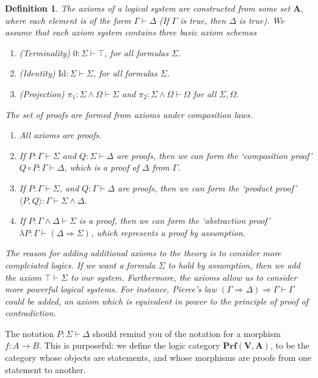 \documentclass{article}
\theoremstyle{plain}
\newtheorem{definition}{Definition}
\begin{document}
\begin{definition}
    The axioms of a logical system are constructed from some set $\mathbf{A}$, where each element is of the form $\Gamma \vdash \Delta$ (If $\Gamma$ is true, then $\Delta$ is true). We assume that each axiom system contains three basic axiom schemas
    \begin{enumerate}
        \item(Terminality) $0: \Sigma \vdash \top$, for all formulas $\Sigma$.
        \item(Identity) $\text{Id}: \Sigma \vdash \Sigma$, for all formulas $\Sigma$.
        \item(Projection) $\pi_1: \Sigma \wedge \Omega \vdash \Sigma$ and $\pi_2: \Sigma \wedge \Omega \vdash \Omega$ for all $\Sigma, \Omega$.
    \end{enumerate}
    The set of proofs are formed from axioms under composition laws.
    \begin{enumerate}
        \item All axioms are proofs.
        \item If $P: \Gamma \vdash \Sigma$ and $Q: \Sigma \vdash \Delta$ are proofs, then we can form the `composition proof' $Q \circ P: \Gamma \vdash \Delta$, which is a proof of $\Delta$ from $\Gamma$.
        \item If $P: \Gamma \vdash \Sigma$, and $Q: \Gamma \vdash \Delta$ are proofs, then we can form the `product proof' $\langle P,Q \rangle: \Gamma \vdash \Sigma \wedge \Delta$.
        \item If $P: \Gamma \wedge \Delta \vdash \Sigma$ is a proof, then we can form the `abstraction proof' $\lambda P: \Gamma \vdash (\Delta \Rightarrow \Sigma)$, which represents a proof by assumption.
    \end{enumerate}
    The reason for adding additional axioms to the theory is to consider more complciated logics. If we want a formula $\Sigma$ to hold by assumption, then we add the axiom $\top \vdash \Sigma$ to our system. Furthermore, the axioms allow us to consider more powerful logical systems. For instance, Pierce's law $(\Gamma \Rightarrow \Delta) \Rightarrow \Gamma \vdash \Gamma$ could be added, an axiom which is equivalent in power to the principle of proof of contradiction.
\end{definition}

The notation $P: \Sigma \vdash \Delta$ should remind you of the notation for a morphism $f: A \to B$. This is purposeful: we define the logic category $\mathbf{Prf}(\mathbf{V},\mathbf{A})$, to be the category whose objects are statements, and whose morphisms are proofs from one statement to another.
\end{document}
